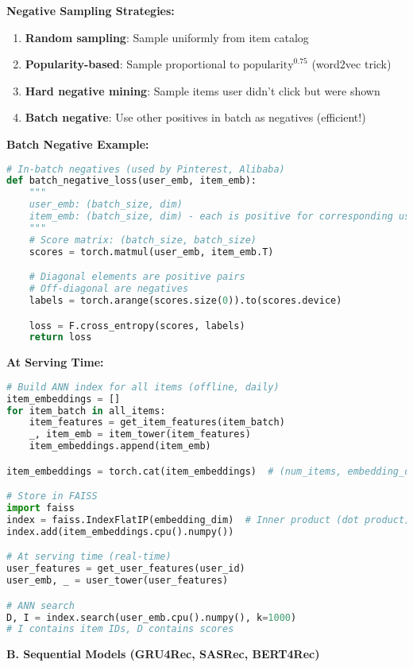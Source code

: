 \documentclass[10pt]{article}
\begin{document}
\textbf{Negative Sampling Strategies:}
\begin{enumerate}
\item \textbf{Random sampling}: Sample uniformly from item catalog
\item \textbf{Popularity-based}: Sample proportional to $\text{popularity}^{0.75}$ (word2vec trick)
\item \textbf{Hard negative mining}: Sample items user didn't click but were shown
\item \textbf{Batch negative}: Use other positives in batch as negatives (efficient!)
\end{enumerate}

\textbf{Batch Negative Example:}
\begin{lstlisting}[language=Python]
# In-batch negatives (used by Pinterest, Alibaba)
def batch_negative_loss(user_emb, item_emb):
    """
    user_emb: (batch_size, dim)
    item_emb: (batch_size, dim) - each is positive for corresponding user
    """
    # Score matrix: (batch_size, batch_size)
    scores = torch.matmul(user_emb, item_emb.T)

    # Diagonal elements are positive pairs
    # Off-diagonal are negatives
    labels = torch.arange(scores.size(0)).to(scores.device)

    loss = F.cross_entropy(scores, labels)
    return loss
\end{lstlisting}

\textbf{At Serving Time:}
\begin{lstlisting}[language=Python]
# Build ANN index for all items (offline, daily)
item_embeddings = []
for item_batch in all_items:
    item_features = get_item_features(item_batch)
    _, item_emb = item_tower(item_features)
    item_embeddings.append(item_emb)

item_embeddings = torch.cat(item_embeddings)  # (num_items, embedding_dim)

# Store in FAISS
import faiss
index = faiss.IndexFlatIP(embedding_dim)  # Inner product (dot product)
index.add(item_embeddings.cpu().numpy())

# At serving time (real-time)
user_features = get_user_features(user_id)
user_emb, _ = user_tower(user_features)

# ANN search
D, I = index.search(user_emb.cpu().numpy(), k=1000)
# I contains item IDs, D contains scores
\end{lstlisting}

\textbf{B. Sequential Models (GRU4Rec, SASRec, BERT4Rec)}
\end{document}

